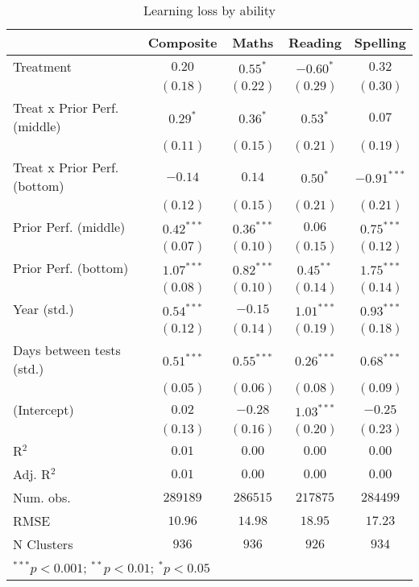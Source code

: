 
\begin{table}
\begin{center}
\begin{tabular}{l c c c c}
\hline
 & Composite & Maths & Reading & Spelling \\
\hline
Treatment                    & $0.20$       & $0.55^{*}$   & $-0.60^{*}$  & $0.32$        \\
                             & $(0.18)$     & $(0.22)$     & $(0.29)$     & $(0.30)$      \\
Treat x Prior Perf. (middle) & $0.29^{*}$   & $0.36^{*}$   & $0.53^{*}$   & $0.07$        \\
                             & $(0.11)$     & $(0.15)$     & $(0.21)$     & $(0.19)$      \\
Treat x Prior Perf. (bottom) & $-0.14$      & $0.14$       & $0.50^{*}$   & $-0.91^{***}$ \\
                             & $(0.12)$     & $(0.15)$     & $(0.21)$     & $(0.21)$      \\
Prior Perf. (middle)         & $0.42^{***}$ & $0.36^{***}$ & $0.06$       & $0.75^{***}$  \\
                             & $(0.07)$     & $(0.10)$     & $(0.15)$     & $(0.12)$      \\
Prior Perf. (bottom)         & $1.07^{***}$ & $0.82^{***}$ & $0.45^{**}$  & $1.75^{***}$  \\
                             & $(0.08)$     & $(0.10)$     & $(0.14)$     & $(0.14)$      \\
Year (std.)                  & $0.54^{***}$ & $-0.15$      & $1.01^{***}$ & $0.93^{***}$  \\
                             & $(0.12)$     & $(0.14)$     & $(0.19)$     & $(0.18)$      \\
Days between tests (std.)    & $0.51^{***}$ & $0.55^{***}$ & $0.26^{***}$ & $0.68^{***}$  \\
                             & $(0.05)$     & $(0.06)$     & $(0.08)$     & $(0.09)$      \\
(Intercept)                  & $0.02$       & $-0.28$      & $1.03^{***}$ & $-0.25$       \\
                             & $(0.13)$     & $(0.16)$     & $(0.20)$     & $(0.23)$      \\
\hline
R$^2$                        & $0.01$       & $0.00$       & $0.00$       & $0.00$        \\
Adj. R$^2$                   & $0.01$       & $0.00$       & $0.00$       & $0.00$        \\
Num. obs.                    & $289189$     & $286515$     & $217875$     & $284499$      \\
RMSE                         & $10.96$      & $14.98$      & $18.95$      & $17.23$       \\
N Clusters                   & $936$        & $936$        & $926$        & $934$         \\
\hline
\multicolumn{5}{l}{\scriptsize{$^{***}p<0.001$; $^{**}p<0.01$; $^{*}p<0.05$}}
\end{tabular}
\caption{Learning loss by ability}
\label{tableability}
\end{center}
\end{table}
